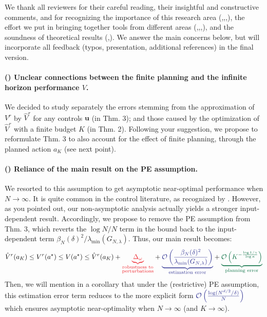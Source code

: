 \documentclass{article}
\begin{document}
	
We thank all reviewers for their careful reading, their insightful and constructive comments, and for recognizing the importance of this research area (,,,), the effort we put in bringing together tools from different areas (,,,), and the soundness of theoretical results (,). We answer the main concerns below, but will incorporate all feedback (typos, presentation, additional references) in the final version.

\paragraph{() Unclear connections between the finite planning and the infinite horizon performance $V$.} We decided to study separately the errors stemming from the approximation of $V^r$ by $\hat{V}^r$ for any controls $\mathbf{u}$ (in Thm. 3); and those caused by the optimization of $\hat{V}^r$ with a finite budget $K$ (in Thm. 2). Following your suggestion, we propose to reformulate Thm. 3 to also account for the effect of finite planning, through the planned action $a_K$ (see next point).

\paragraph{() Reliance of the main result on the PE assumption.} We resorted to this assumption to get asymptotic near-optimal performance when $N\to\infty$. It is quite common in the control literature, as recognized by . %
However, as you pointed out, our non-asymptotic analysis actually yields a stronger input-dependent result. Accordingly, we propose to remove the PE assumption from Thm. 3, which reverts the $\log N / N$ term in the bound back to the input-dependent term $\beta_N(\delta)^2/\lambda_{\min}(G_{N,\lambda})$. Thus, our main result becomes:
\begin{equation*}
\hat{V}^r(a_K) \leq {V}^r(a^\star) \leq V(a^\star) \leq \hat{V}^r(a_K) + \hlr{\underbrace{\Delta_\omega}_{\substack{\text{robustness to}\\ \text{perturbations}}}} + \hlb{\underbrace{\cO\left(\frac{\beta_N(\delta)^2}{\lambda_{\min}(G_{N,\lambda})}\right)}_{\text{estimation error}}} + \hlg{\underbrace{\cO\left(K^{-\frac{\log 1/\gamma}{\log \kappa}}\right)}_{\text{planning error}}}
\end{equation*}
 Then, we will mention in a corollary that under the (restrictive) PE assumption, this estimation error term reduces to the more explicit form $\hlb{{\cO\left(\frac{\log(N^{d/2}/\delta)}{N}\right)}}$ which ensures asymptotic near-optimality when $N\to\infty$ (and $K\to\infty$).
\end{document}
